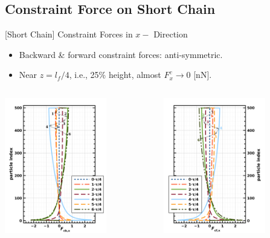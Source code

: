 \documentclass[t,presentation]{beamer}
\begin{document}
\subsection{Constraint Force on Short Chain}
\label{sec:orge853c19}
\begin{frame}[label={sec:org9ecb48b}]{[Short Chain] Constraint  Forces in \(x-\) Direction}
\begin{itemize}
\item Backward \& forward constraint forces: anti-symmetric.
\item Near \(z=l_{f}/4\), i.e., 25\% height, almost \(F_x^c\to 0\) [nN].
\end{itemize}
\begin{columns}[c]
\begin{column}{.45\textwidth}
\centering
\includegraphics[width=1.75in]{figures/cXpvdf500FC1.png}\par
\end{column}
\begin{column}{.45\textwidth} %
\centering
\includegraphics[width=1.75in]{figures/cXpvdf500FC2.png}\par
\end{column}
\end{columns}
\end{frame}
\end{document}
